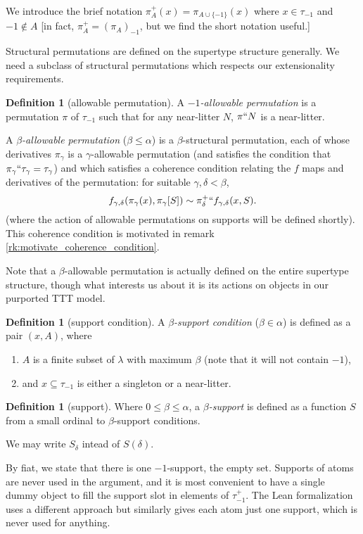\documentclass[112pt]{article}
\theoremstyle{definition}
\newtheorem{definition}[theorem]{Definition}
\theoremstyle{remark}
\begin{document}
We introduce the brief notation $\pi^+_A(x) = \pi_{A \cup \{-1\}}(x)$ where $x \in \tau_{-1}$ and $-1 \not\in A$ [in fact, $\pi^+_A = (\pi_A)_{-1}$, but we find the short notation useful.]

Structural permutations are defined on the supertype structure generally.  We need a subclass of structural permutations which respects our extensionality requirements.

\begin{definition}[allowable permutation]\label{def:allowable_permutation}
A {\em $-1$-allowable permutation\/} is a permutation $\pi$ of $\tau_{-1}$ such that for any near-litter $N$, $\pi``N$ is a near-litter.

A {\em $\beta$-allowable permutation\/} ($\beta \leq \alpha$) is a $\beta$-structural permutation, each of whose derivatives $\pi_\gamma$ is a $\gamma$-allowable permutation (and satisfies the condition that $\pi_\gamma``\tau_\gamma = \tau_\gamma$) and which satisfies a coherence condition relating the $f$ maps and derivatives of the permutation:  for suitable $\gamma,\delta<\beta$, $$f_{\gamma,\delta}(\pi_\gamma(x),\pi_{\gamma}[S]) \sim \pi_\delta^+``f_{\gamma,\delta}(x,S).$$  (where the action of allowable
  permutations on supports will be defined shortly).
  {This coherence condition is motivated in remark \ref{rk:motivate_coherence_condition}.}
\end{definition}

Note that a $\beta$-allowable permutation is actually defined on the entire supertype structure, though what interests us about it is its actions on objects in our purported TTT model.

\begin{definition}[support condition]\label{def:support_condition}
A {\em $\beta$-support condition\/} ($\beta \in \alpha$) is defined as a pair $(x,A)$, where
\begin{enumerate}

\item $A$ is a finite subset of $\lambda$  with maximum $\beta$ (note that it will not contain $-1$),

\item and $x\subseteq \tau_{-1}$ is either a singleton or a near-litter.

\end{enumerate}
\end{definition}

\begin{definition}[support]\label{def:support}
Where $0\leq\beta \leq \alpha$, a {\em $\beta$-support\/} is defined as a function $S$ from a small ordinal to $\beta$-support conditions.

We may write $S_\delta$ intead of $S(\delta)$.

By fiat, we state that there is one $-1$-support, the empty set.   Supports of atoms are never used in the argument, and it is most convenient to have a single dummy object to fill the support slot in elements of
$\tau_{-1}^+$.  The Lean formalization uses a different approach but similarly gives each atom just one support, which is never used for anything.
\end{definition}
\end{document}
